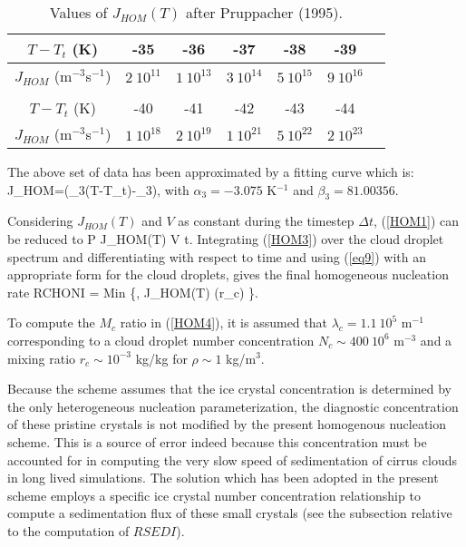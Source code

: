%
\begin{table}
\caption{Values of $J_{HOM}(T)$ after Pruppacher (1995).}
\begin{center}\label{table3prime}
\begin{tabular}{|c|c|c|c|c|c|c|}
\hline
$T-T_t$ (K)  & -35 & -36 & -37 & -38 & -39 \\
\hline
$J_{HOM}$ (m$^{-3}$s$^{-1}$) & $2\ 10^{11}$ & $1\ 10^{13}$ & $3\ 10^{14}$ & $5\
10^{15}$ & $9\ 10^{16}$ \\
\hline
\multicolumn{6}{c}{}\\
\hline
$T-T_t$ (K)  & -40 & -41 & -42 & -43 & -44 \\
\hline
$J_{HOM}$ (m$^{-3}$s$^{-1}$) & $1\ 10^{18}$ & $2\ 10^{19}$ & $1\ 10^{21}$ & $5\ 10^{2
2}$ & $2\ 10^{23}$ \\
\hline
\end{tabular}
\end{center}
\end{table}
%
\noindent The above set of data has been approximated by a fitting curve which
is:
%
\be\label{HOM2}
J_{HOM}=\exp(\alpha_3(T-T_t)-\beta_3),
\ee
%
\noindent with $\alpha_3=-3.075$ K$^{-1}$ and $\beta_3=81.00356$.

Considering $J_{HOM}(T)$ and $V$ as constant during the timestep
$\Delta t$, (\ref{HOM1}) can be reduced to
%
\be\label{HOM3}
{\cal P} \approx J_{HOM}(T) V \Delta t.
\ee
%
Integrating (\ref{HOM3}) over the cloud droplet spectrum and differentiating
with respect to time and using (\ref{eq9}) with an appropriate form for the
cloud droplets, gives the final homogeneous nucleation rate
%
\be\label{HOM4}
RCHONI = Min \Big\{,
           \frac{\displaystyle{\pi}}{\displaystyle{6}}
           J_{HOM}(T) (\rho r_c)
           \Big\}.
\ee
%

To compute the $M_c$ ratio in (\ref{HOM4}), it is assumed that
$\lambda_c=1.1\ 10^5$ m$^{-1}$
corresponding to a cloud droplet number concentration $N_c \sim 400\ 10^6$
m$^{-3}$ and a mixing ratio $r_c \sim 10^{-3}$ kg/kg for $\rho \sim 1$ kg/m$^3$.

Because the scheme assumes that the ice crystal concentration is determined by
the only heterogeneous nucleation parameterization, the diagnostic concentration
of these pristine crystals is not modified by the present homogenous nucleation
scheme. This is a source of error indeed because this concentration must be
accounted for in computing the very slow speed of sedimentation of cirrus clouds
in long lived simulations. The solution which has been adopted in the present
scheme employs a specific ice crystal number concentration relationship to
compute a sedimentation flux of these small crystals (see the subsection
relative to the computation of $RSEDI$).

